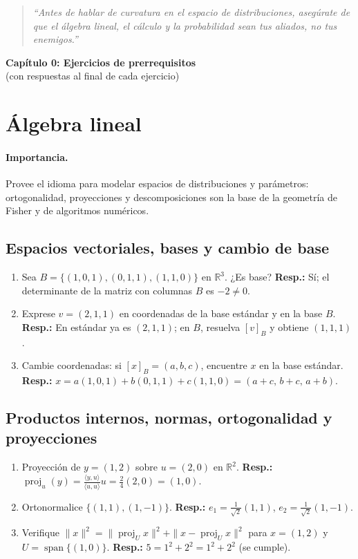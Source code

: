 
\begin{quotation}
	\itshape
	``Antes de hablar de curvatura en el espacio de distribuciones, asegúrate de que el álgebra lineal, el cálculo y la probabilidad sean tus aliados, no tus enemigos.''
\end{quotation}
	
	\begin{center}
		{\LARGE \textbf{Capítulo 0: Ejercicios de prerrequisitos}}\\[4pt]
		{\large (con respuestas al final de cada ejercicio)}
	\end{center}
	
	\section{Álgebra lineal}
	\paragraph{Importancia.} Provee el idioma para modelar espacios de distribuciones y parámetros: ortogonalidad, proyecciones y descomposiciones son la base de la geometría de Fisher y de algoritmos numéricos.
	
	\subsection*{Espacios vectoriales, bases y cambio de base}
	\begin{enumerate}
		\item Sea $B=\{(1,0,1),(0,1,1),(1,1,0)\}$ en $\mathbb R^3$. ¿Es base? \textbf{Resp.:} Sí; el determinante de la matriz con columnas $B$ es $-2\ne0$.
		\item Exprese $v=(2,1,1)$ en coordenadas de la base estándar y en la base $B$. \textbf{Resp.:} En estándar ya es $(2,1,1)$; en $B$, resuelva $[v]_B$ y obtiene $(1,1,1)$.
		\item Cambie coordenadas: si $[x]_B=(a,b,c)$, encuentre $x$ en la base estándar. \textbf{Resp.:} $x=a(1,0,1)+b(0,1,1)+c(1,1,0)=(a+c,\,b+c,\,a+b)$.
	\end{enumerate}
	
	\subsection*{Productos internos, normas, ortogonalidad y proyecciones}
	\begin{enumerate}
		\item Proyección de $y=(1,2)$ sobre $u=(2,0)$ en $\mathbb R^2$. \textbf{Resp.:} $\operatorname{proj}_u(y)=\frac{\langle y,u\rangle}{\langle u,u\rangle}u=\tfrac{2}{4}(2,0)=(1,0)$.
		\item Ortonormalice $\{(1,1),(1,-1)\}$. \textbf{Resp.:} $e_1=\tfrac{1}{\sqrt2}(1,1)$, $e_2=\tfrac{1}{\sqrt2}(1,-1)$.
		\item Verifique $\|x\|^2=\|\operatorname{proj}_U x\|^2+\|x-\operatorname{proj}_U x\|^2$ para $x=(1,2)$ y $U=\operatorname{span}\{(1,0)\}$. \textbf{Resp.:} $5=1^2+2^2=1^2+2^2$ (se cumple).
	\end{enumerate}
	
